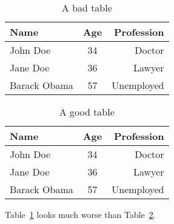 
\begin{table}[h]
\centering %
\begin{tabular}{|l|c|r|}
\hline
Name & Age & Profession\\
\hline
John Doe & 34 & Doctor\\
\hline
Jane Doe & 36 & Lawyer\\
\hline
Barack Obama & 57 & Unemployed\\
\hline
\end{tabular}
\caption{A bad table}
\label{tab:bad}
\end{table}


\begin{table}[h]
\centering
\begin{tabular}{lcr}
\toprule
Name & Age & Profession\\
\midrule
John Doe & 34 & Doctor\\
Jane Doe & 36 & Lawyer\\
Barack Obama & 57 & Unemployed\\
\bottomrule
\end{tabular}
\caption{A good table}
\label{tab:good}
\end{table}

Table~\ref{tab:bad} looks much worse than Table~\ref{tab:good}.
